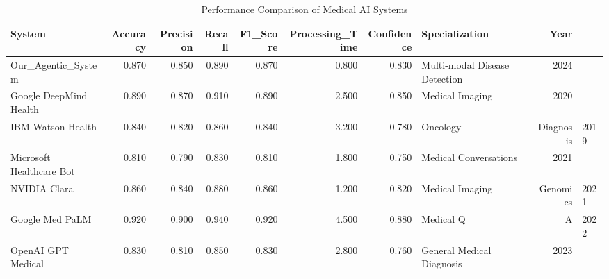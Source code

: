 \begin{table}
\caption{Performance Comparison of Medical AI Systems}
\label{tab:performance_comparison}
\begin{tabular}{lrrrrrrlr}
\toprule
System & Accuracy & Precision & Recall & F1_Score & Processing_Time & Confidence & Specialization & Year \\
\midrule
Our_Agentic_System & 0.870 & 0.850 & 0.890 & 0.870 & 0.800 & 0.830 & Multi-modal Disease Detection & 2024 \\
Google DeepMind Health & 0.890 & 0.870 & 0.910 & 0.890 & 2.500 & 0.850 & Medical Imaging & 2020 \\
IBM Watson Health & 0.840 & 0.820 & 0.860 & 0.840 & 3.200 & 0.780 & Oncology & Diagnosis & 2019 \\
Microsoft Healthcare Bot & 0.810 & 0.790 & 0.830 & 0.810 & 1.800 & 0.750 & Medical Conversations & 2021 \\
NVIDIA Clara & 0.860 & 0.840 & 0.880 & 0.860 & 1.200 & 0.820 & Medical Imaging & Genomics & 2021 \\
Google Med PaLM & 0.920 & 0.900 & 0.940 & 0.920 & 4.500 & 0.880 & Medical Q&A & 2022 \\
OpenAI GPT Medical & 0.830 & 0.810 & 0.850 & 0.830 & 2.800 & 0.760 & General Medical Diagnosis & 2023 \\
\bottomrule
\end{tabular}
\end{table}
